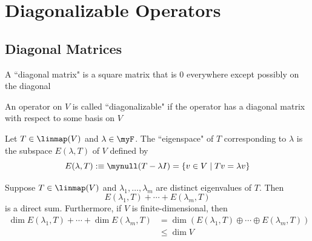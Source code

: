 \section{Diagonalizable Operators}
\subsection{Diagonal Matrices}

\setcounter{thm}{47}
\begin{mydef} 
  A ``diagonal matrix" is a square matrix that is $0$ everywhere except possibly on \nopagebreak the diagonal
\end{mydef}

\setcounter{thm}{49}
\begin{mydef} [diagonalizable]
  An operator on $V$ is called ``diagonalizable" if the operator has a diagonal matrix with respect to some basis on $V$
\end{mydef}

\setcounter{thm}{51}
\label{eigenspace}
\begin{mydef} 
  Let $T \in \linmap(V)$ and $\lambda \in \myF$. The ``eigenspace" of $T$ corresponding to $\lambda$ is the subspace $E(\lambda, T)$ of $V$ defined by
  \begin{equation}
    E(\lambda, T) :\equiv  \mynull(T-\lambda I) = \{ v\in V \mid Tv = \lambda v\}
  \end{equation}
\end{mydef}

\setcounter{thm}{53}
\begin{thm} 
  \label{thm: sum of eigenspaces is a direct sum}
  Suppose $T\in \linmap (V)$ and $\lambda_1, \dots, \lambda_m$ are distinct eigenvalues of $T$. Then
  \begin{equation}
    E(\lambda_1, T) + \cdots + E(\lambda_m, T)
  \end{equation}
  is a direct sum. Furthermore, if $V$ is finite-dimensional, then
  \begin{equation}
    \begin{aligned}
      \dim E(\lambda_1, T) + \cdots + \dim E(\lambda_m, T)
      & = \dim \left( E(\lambda_1, T)  \oplus \cdots \oplus E(\lambda_m, T) \right) \\
      & \leq \dim V
    \end{aligned}
  \end{equation}
\end{thm}

